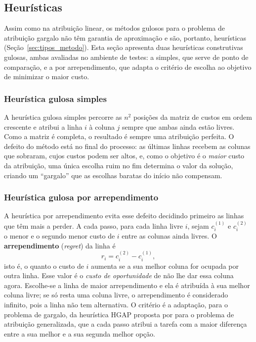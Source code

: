 \subsection{Heurísticas}
\label{sec:lbap_heuristicas}

Assim como na atribuição linear, os métodos gulosos para o problema de atribuição gargalo não têm garantia de aproximação e são, portanto, heurísticas (Seção~\ref{sec:tipos_metodo}). Esta seção apresenta duas heurísticas construtivas gulosas, ambas avaliadas no ambiente de testes: a simples, que serve de ponto de comparação, e a por arrependimento, que adapta o critério de escolha ao objetivo de minimizar o maior custo.

\subsubsection{Heurística gulosa simples}

A heurística gulosa simples percorre as $n^2$ posições da matriz de custos em ordem crescente e atribui a linha $i$ à coluna $j$ sempre que ambas ainda estão livres. Como a matriz é completa, o resultado é sempre uma atribuição perfeita. O defeito do método está no final do processo: as últimas linhas recebem as colunas que sobraram, cujos custos podem ser altos, e, como o objetivo é o \textit{maior} custo da atribuição, uma única escolha ruim no fim determina o valor da solução, criando um ``gargalo'' que as escolhas baratas do início não compensam.

\subsubsection{Heurística gulosa por arrependimento}

A heurística por arrependimento evita esse defeito decidindo primeiro as linhas que têm mais a perder. A cada passo, para cada linha livre $i$, sejam $c_i^{(1)}$ e $c_i^{(2)}$ o menor e o segundo menor custo de $i$ entre as colunas ainda livres. O \textbf{arrependimento} (\textit{regret}) da linha é
\begin{equation}
    r_i = c_i^{(2)} - c_i^{(1)},
    \label{eq:arrependimento}
\end{equation}
isto é, o quanto o custo de $i$ aumenta se a sua melhor coluna for ocupada por outra linha. Esse valor é o \textit{custo de oportunidade} de não lhe dar essa coluna agora. Escolhe-se a linha de maior arrependimento e ela é atribuída à sua melhor coluna livre; se só resta uma coluna livre, o arrependimento é considerado infinito, pois a linha não tem alternativa. O critério é a adaptação, para o problema de gargalo, da heurística HGAP proposta por  para o problema de atribuição generalizada, que a cada passo atribui a tarefa com a maior diferença entre a sua melhor e a sua segunda melhor opção.

